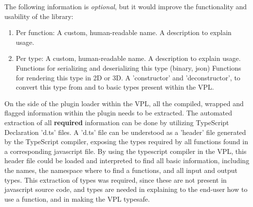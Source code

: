 The following information is \emph{optional}, but it would improve the functionality and usability of the library:
\begin{enumerate}[-]
  \item Per function:
  \subitem A custom, human-readable name.
  \subitem A description to explain usage.

  \item Per type:
  \subitem A custom, human-readable name.
  \subitem A description to explain usage.
  \subitem Functions for serializing and deserializing this type (binary, json)  
  \subitem Functions for rendering this type in 2D or 3D.
  \subitem A 'constructor' and 'deconstructor', to convert this type from and to basic types present within the VPL.  
\end{enumerate}




On the side of the plugin loader within the VPL, all the compiled, wrapped and flagged information within the plugin needs to be extracted. 
The automated extraction of all \textbf{required} information can be done by utilizing TypeScript Declaration 'd.ts' files. 
A 'd.ts' file can be understood as a 'header' file generated by the TypeScript compiler, exposing the types required by all functions found in a corresponding javascript file.
By using the typescript compiler in the VPL, this header file could be loaded and interpreted to find all basic information, including the names, the namespace where to find a functions, and all input and output types.
This extraction of types was required, since these are not present in javascript source code, and types are needed in explaining to the end-user how to use a function, and in making the VPL typesafe.

